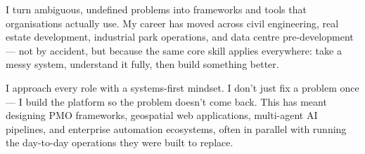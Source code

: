 \par\smallskip I turn ambiguous, undefined problems into frameworks and tools that organisations actually use. My career has moved across civil engineering, real estate development, industrial park operations, and data centre pre-development — not by accident, but because the same core skill applies everywhere: take a messy system, understand it fully, then build something better.
\par\smallskip I approach every role with a systems-first mindset. I don't just fix a problem once — I build the platform so the problem doesn't come back. This has meant designing PMO frameworks, geospatial web applications, multi-agent AI pipelines, and enterprise automation ecosystems, often in parallel with running the day-to-day operations they were built to replace.
